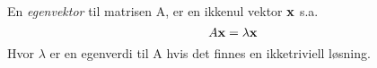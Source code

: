 En \emph{egenvektor} til matrisen A,
er en ikkenul vektor $\mathbf{x}$ s.a.
$$A\mathbf{x} = \lambda\mathbf{x}$$
Hvor $\lambda$ er en egenverdi til A hvis det finnes en ikketriviell løsning.
